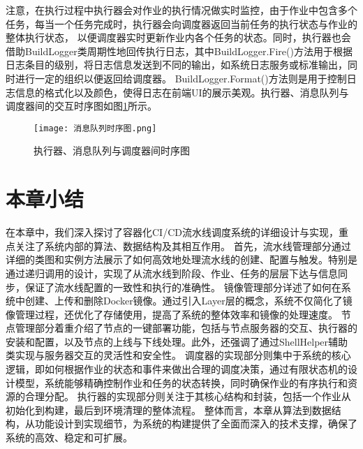 注意，在执行过程中执行器会对作业的执行情况做实时监控，由于作业中包含多个任务，每当一个任务完成时，执行器会向调度器返回当前任务的执行状态与作业的整体执行状态，
以便调度器实时更新作业内各个任务的状态。同时，执行器也会借助BuildLogger类周期性地回传执行日志，其中BuildLogger.Fire()方法用于根据日志条目的级别，将日志信息发送到不同的输出，如系统日志服务或标准输出，同时进行一定的组织以便返回给调度器。
BuildLogger.Format()方法则是用于控制日志信息的格式化以及颜色，使得日志在前端UI的展示美观。执行器、消息队列与调度器间的交互时序图如图\ref{fig:执行器、消息队列与调度器间时序图}所示。

\begin{figure}[h]
  \centering
  \texttt{[image: 消息队列时序图.png]}
  \caption{执行器、消息队列与调度器间时序图}
  \label{fig:执行器、消息队列与调度器间时序图}
\end{figure}


\section{本章小结}
在本章中，我们深入探讨了容器化CI/CD流水线调度系统的详细设计与实现，重点关注了系统内部的算法、数据结构及其相互作用。
首先，流水线管理部分通过详细的类图和实例方法展示了如何高效地处理流水线的创建、配置与触发。特别是通过递归调用的设计，实现了从流水线到阶段、作业、任务的层层下达与信息同步，保证了流水线配置的一致性和执行的准确性。
镜像管理部分详述了如何在系统中创建、上传和删除Docker镜像。通过引入Layer层的概念，系统不仅简化了镜像管理过程，还优化了存储使用，提高了系统的整体效率和镜像的处理速度。
节点管理部分着重介绍了节点的一键部署功能，包括与节点服务器的交互、执行器的安装和配置，以及节点的上线与下线处理。此外，还强调了通过ShellHelper辅助类实现与服务器交互的灵活性和安全性。
调度器的实现部分则集中于系统的核心逻辑，即如何根据作业的状态和事件来做出合理的调度决策，通过有限状态机的设计模型，系统能够精确控制作业和任务的状态转换，同时确保作业的有序执行和资源的合理分配。
执行器的实现部分则关注于其核心结构和封装，包括一个作业从初始化到构建，最后到环境清理的整体流程。
整体而言，本章从算法到数据结构，从功能设计到实现细节，为系统的构建提供了全面而深入的技术支撑，确保了系统的高效、稳定和可扩展。